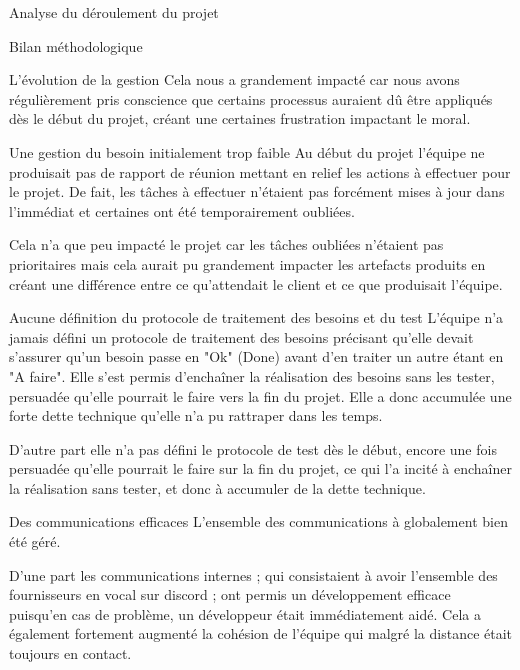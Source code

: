 \documentclass[]{article}
\begin{document}
{\begin{section}{Analyse du déroulement du projet}
\begin{subsection}{Bilan méthodologique}
\begin{subsubsection}{L'évolution de la gestion}
         Cela nous a grandement impacté car nous avons régulièrement pris conscience que certains processus auraient dû être appliqués dès le début du projet, créant une certaines frustration impactant le moral.
     \end{subsubsection}

\newpage

     \begin{subsubsection}{Une gestion du besoin initialement trop faible}
         Au début du projet l'équipe ne produisait pas de rapport de réunion mettant en relief les actions à effectuer pour le projet. De fait, les tâches à effectuer n'étaient pas forcément mises à jour dans l'immédiat et certaines ont été temporairement oubliées.

         Cela n'a que peu impacté le projet car les tâches oubliées n'étaient pas prioritaires mais cela aurait pu grandement impacter les artefacts produits en créant une différence entre ce qu'attendait le client et ce que produisait l'équipe.
     \end{subsubsection}

     \begin{subsubsection}{Aucune définition du protocole de traitement des besoins et du test}
         L'équipe n'a jamais défini un protocole de traitement des besoins précisant qu'elle devait s'assurer qu'un besoin passe en "Ok" (Done) avant d'en traiter un autre étant en "A faire". Elle s'est permis d'enchaîner la réalisation des besoins sans les tester, persuadée qu'elle pourrait le faire vers la fin du projet. Elle a donc accumulée une forte dette technique qu'elle n'a pu rattraper dans les temps.

         D'autre part elle n'a pas défini le protocole de test dès le début, encore une fois persuadée qu'elle pourrait le faire sur la fin du projet, ce qui l'a incité à enchaîner la réalisation sans tester, et donc à accumuler de la dette technique.
     \end{subsubsection}

     \begin{subsubsection}{Des communications efficaces}
         L'ensemble des communications à globalement bien été géré.

         D'une part les communications internes ; qui consistaient à avoir l'ensemble des fournisseurs en vocal sur discord ; ont permis un développement efficace puisqu'en cas de problème, un développeur était immédiatement aidé. Cela a également fortement augmenté la cohésion de l'équipe qui malgré la distance était toujours en contact.


\end{subsubsection}
\end{subsection}
\end{section}}
\end{document}
